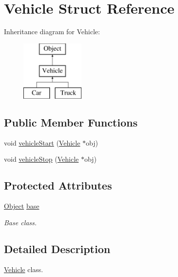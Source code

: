 \hypertarget{structVehicle}{\section{Vehicle Struct Reference}
\label{structVehicle}
}
Inheritance diagram for Vehicle\-:\begin{figure}[H]
\begin{center}
\leavevmode
\includegraphics[height=3.000000cm]{structVehicle}
\end{center}
\end{figure}
\subsection*{Public Member Functions}
\begin{DoxyCompactItemize}
\item 
void \hyperlink{structVehicle_a6891d3d28853bc3fdd075596dc6de9f8}{vehicle\-Start} (\hyperlink{structVehicle}{Vehicle} $\ast$obj)
\item 
void \hyperlink{structVehicle_a4dcbcba43792dcd673a552b14479ab77}{vehicle\-Stop} (\hyperlink{structVehicle}{Vehicle} $\ast$obj)
\end{DoxyCompactItemize}
\subsection*{Protected Attributes}
\begin{DoxyCompactItemize}
\item 
\hypertarget{structVehicle_ad7970f528d429f6fc1725173e93a77c2}{\hyperlink{structObject}{Object} \hyperlink{structVehicle_ad7970f528d429f6fc1725173e93a77c2}{base}}\label{structVehicle_ad7970f528d429f6fc1725173e93a77c2}

\begin{DoxyCompactList}\small\item\em Base class. \end{DoxyCompactList}\end{DoxyCompactItemize}


\subsection{Detailed Description}
\hyperlink{structVehicle}{Vehicle} class. 

